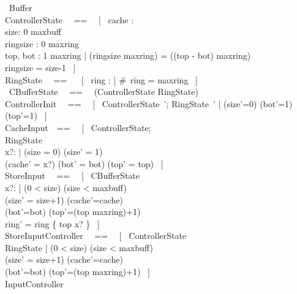 \begin{circus}
    \circprocess\ Buffer \circdef \circbegin \\
    ControllerState ~~==~~ [~ cache : \nat
        \\%
        size: 0 \upto maxbuff
        \\%
        ringsize : 0 \upto maxring
        \\%
        top, bot : 1 \upto maxring
        |
        (ringsize \mod maxring) = ((top - bot) \mod maxring)
        \\%
        ringsize = size-1
        ~] \\
    RingState ~~== ~~ [~ ring : \seq \nat | \#~ring = maxring ~] \\
    \circstate\ CBufferState ~~==~~ (ControllerState \lor RingState) \\
    ControllerInit ~~==~~ [~ ControllerState~'; RingState~' | (size'=0) \land (bot'=1) \land (top'=1) ~] \\
    CacheInput~~==~~ [~ \Delta ControllerState;
        \\%
        \Xi RingState
        \\%
        x?:\nat
        |
        (size = 0) \land (size' = 1)
        \\%
        (cache' = x?) \land (bot' = bot) \land (top' = top) ~]\\
    StoreInput ~~==~~ [~ \Delta CBufferState
        \\%
        x?: \nat
        |
        (0 < size) \land (size < maxbuff)
        \\%
        (size' = size+1) \land (cache'=cache)
        \\%
        (bot'=bot) \land (top'=(top \mod maxring)+1)
        \\%
        ring' = ring \oplus \{ top \mapsto x? \} ~] \\
    StoreInputController ~~==~~ [~ \Delta ControllerState
        \\%
        \Xi RingState
        |
        (0 < size) \land (size < maxbuff)
        \\%
        (size' = size+1) \land (cache'=cache)
        \\%
        (bot'=bot) \land (top'=(top \mod maxring)+1) ~] \\
    InputController ~~\circdef~~ \\


\end{circus}
